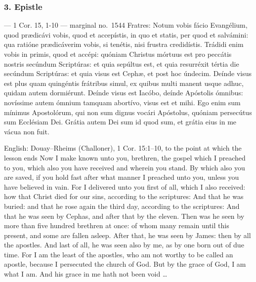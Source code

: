 \elementguard
\subsubsection*{3. Epistle }

\begin{appointedlatin}{ --- 1 Cor. 15, 1-10 --- marginal no.\ 1544}
Fratres: Notum vobis fácio Evangélium, quod prædicávi vobis, quod et
accepístis, in quo et statis, per quod et salvámini: qua ratióne prædicáverim
vobis, si tenétis, nisi frustra credidístis. Trádidi enim vobis in primis,
quod et accépi: quóniam Christus mórtuus est pro peccátis nostris secúndum
Scriptúras: et quia sepúltus est, et quia resurréxit tértia die secúndum
Scriptúras: et quia visus est Cephæ, et post hoc úndecim. Deínde visus est
plus quam quingéntis frátribus simul, ex quibus multi manent usque adhuc,
quidam autem dormiérunt. Deínde visus est Iacóbo, deínde Apóstolis ómnibus:
novíssime autem ómnium tamquam abortívo, visus est et mihi. Ego enim sum
mínimus Apostolórum, qui non sum dignus vocári Apóstolus, quóniam persecútus
sum Ecclésiam Dei. Grátia autem Dei sum id quod sum, et grátia eius in me
vácua non fuit.
\end{appointedlatin}

\begin{namedtranslation}{English: Douay--Rheims (Challoner), 1 Cor. 15:1--10, to the point at which the lesson ends}
Now I make known unto you, brethren, the gospel which I preached to you, which
also you have received and wherein you stand. By which also you are saved, if
you hold fast after what manner I preached unto you, unless you have believed
in vain. For I delivered unto you first of all, which I also received: how
that Christ died for our sins, according to the scriptures: And that he was
buried: and that he rose again the third day, according to the scriptures:
And that he was seen by Cephas, and after that by the eleven. Then was he seen
by more than five hundred brethren at once: of whom many remain until this
present, and some are fallen asleep. After that, he was seen by James: then by
all the apostles. And last of all, he was seen also by me, as by one born out
of due time. For I am the least of the apostles, who am not worthy to be
called an apostle, because I persecuted the church of God. But by the grace of
God, I am what I am. And his grace in me hath not been void \dots
\end{namedtranslation}


